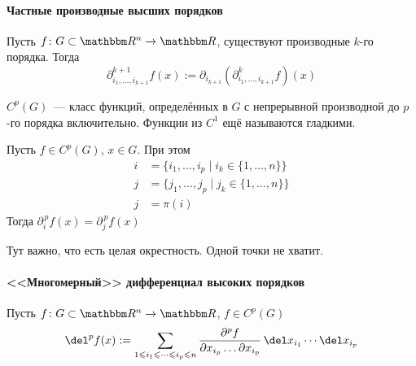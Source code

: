 \documentclass[12pt]{../../../notes}
\begin{document}
\paragraph{Частные производные высших порядков}
\label{par:diffspace::highpartial}

\begin{defn}\label{defn:diffspace::highpartial}
  Пусть $f \colon G \subset \R^n \to \R$, существуют производные $k$-го порядка. Тогда
  \[
    \partial_{i_1, \dotsc, i_{k+1}}^{k+1} f(x) := \partial_{i_{k+1}}(\partial^k_{i_1, \dotsc, i_{k+1}} f) (x)
  \]
\end{defn}
\begin{rem}\label{rem:diffspace::highpartial::smooth}
  $C^p(G)$~--- класс функций, определённых в $G$ с непрерывной производной до $p$-го порядка
  включительно.
  Функции из $C^1$ ещё называются гладкими.
\end{rem}

\begin{thrm}
  \label{thrm:diffspace::highpartial::permut}
  Пусть \mbox{$f \in C^p(G)$}, $x\in G$. При этом
  \[
    \begin{split}
      i &= \{ i_1, \dotsc, i_p \mid i_k \in \{1, \dotsc, n\}\} \\
      j &= \{ j_1, \dotsc, j_p \mid j_k \in \{1, \dotsc, n\}\} \\
      j &= \pi(i)
    \end{split}
  \]
  Тогда 
  $\partial_i^{\,p} f(x) = \partial_j^{\,p} f(x)$
\end{thrm}
\begin{rem}\label{rem:diffspace::highpartial::permut}
  Тут важно, что есть целая окрестность. Одной точки не хватит.
\end{rem}

\paragraph{<<Многомерный>> дифференциал высоких порядков}
\label{par:diffspace::highdiff}

\begin{defn}\label{defn:diffspace::highdiff}
  Пусть $f \colon G \subset \R^n \to \R$, $f\in C^p(G)$
  \[  
    \del^p f(x) := \sum_{1 \leqslant i_1 \leqslant \dotsb \leqslant i_p \leqslant n}
    \frac{\partial^p f}{\partial x_{i_p} \dotso \partial x_{i_p}} \, \del x_{i_1} \dotsm \del x_{i_p}
  \]
\end{defn}
\end{document}

